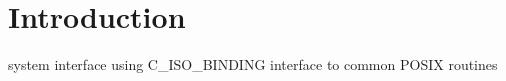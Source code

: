 \hypertarget{index_Introduction}{}\section{Introduction}\label{index_Introduction}
system interface using C\+\_\+\+I\+S\+O\+\_\+\+B\+I\+N\+D\+I\+NG interface to common P\+O\+S\+IX routines

 